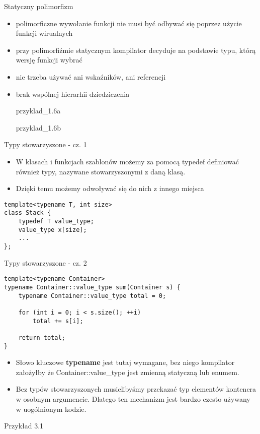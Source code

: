 \documentclass[11pt]{beamer}
\begin{document}
\begin{frame}[fragile]{Statyczny polimorfizm}
	\begin{itemize}
		\item polimorficzne wywołanie funkcji nie musi być odbywać się poprzez użycie funkcji wirualnych
		\item przy polimorfiźmie statycznym kompilator decyduje na podstawie typu, którą wersję funkcji wybrać
		\item nie trzeba używać ani wskaźników, ani referencji
		\item brak wspólnej hierarhii dziedziczenia
		
		\alert{przyklad\_1.6a}
		
		\alert{przyklad\_1.6b}
	\end{itemize}

\end{frame}

\begin{frame}[fragile]{Typy stowarzyszone - cz. 1}
    \begin{itemize}
        \item W klasach i funkcjach szablonów możemy za pomocą typedef definiować również typy, nazywane stowarzyszonymi z daną klasą.
        \item Dzięki temu możemy odwoływać się do nich z innego miejsca
    \end{itemize}
    \begin{lstlisting}[frame=single]
template<typename T, int size>
class Stack {
    typedef T value_type;
    value_type x[size];
    ...
};
    \end{lstlisting}
\end{frame}

\begin{frame}[fragile]{Typy stowarzyszone - cz. 2}
    \begin{lstlisting}[frame=single,basicstyle=\small]
template<typename Container>
typename Container::value_type sum(Container s) {
    typename Container::value_type total = 0;
    
    for (int i = 0; i < s.size(); ++i)
        total += s[i];

    return total;
}
    \end{lstlisting}
    \begin{itemize}
        \item Słowo kluczowe \textbf{typename} jest tutaj wymagane, bez niego kompilator założyłby że Container::value\_type jest zmienną statyczną lub enumem.
        \item Bez typów stowarzyszonych musielibyśmy przekazać typ elementów kontenera w osobnym argumencie. Dlatego ten mechanizm jest bardzo czesto używany w uogólnionym kodzie.
    \end{itemize}
    \alert{Przykład 3.1} 
\end{frame}
\end{document}
